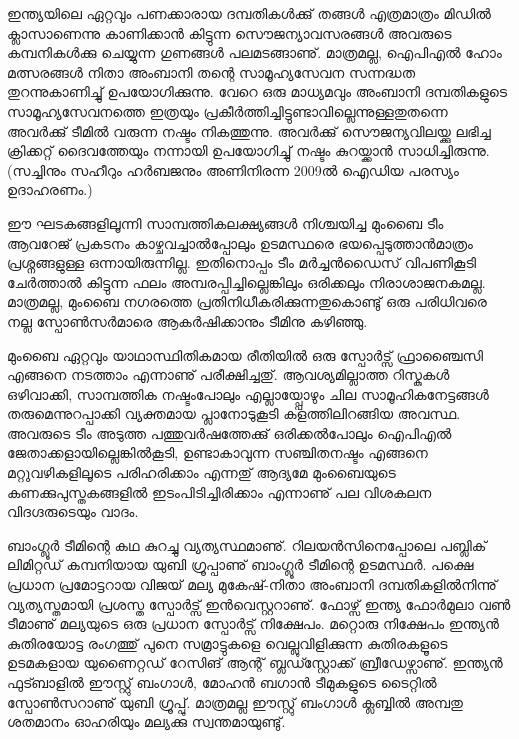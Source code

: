 ഇന്ത്യയിലെ ഏറ്റവും പണക്കാരായ ദമ്പതികള്‍ക്കു്  തങ്ങള്‍ എത്രമാത്രം മിഡില്‍ ക്ലാസാണെന്നു 
കാണിക്കാന്‍ കിട്ടുന്ന സൌജന്യാവസരങ്ങള്‍ അവരുടെ കമ്പനികള്‍ക്കു ചെയ്യുന്ന ഗുണങ്ങള്‍ പലമടങ്ങാണു്. മാത്രമല്ല, 
ഐപിഎല്‍ ഹോം മത്സരങ്ങള്‍ നിതാ അംബാനി തന്റെ സാമൂഹ്യസേവന സന്നദ്ധത തുറന്നുകാണിച്ചു് ഉപയോഗിക്കുന്നു. 
വേറെ ഒരു മാധ്യമവും അംബാനി ദമ്പതികളുടെ സാമൂഹ്യസേവനത്തെ ഇത്രയും പ്രകീര്‍ത്തിച്ചിട്ടുണ്ടാവില്ലെന്നുള്ളതുതന്നെ 
അവര്‍ക്കു് ടീമില്‍ വരുന്ന നഷ്ടം നികത്തുന്നു. അവര്‍ക്കു് സൌജന്യവിലയ്ക്കു ലഭിച്ച ക്രിക്കറ്റ് ദൈവത്തേയും നന്നായി ഉപയോഗിച്ചു് 
നഷ്ടം കുറയ്ക്കാന്‍ സാധിച്ചിരുന്നു. (സച്ചിനും സഹീറും ഹര്‍ബജനും അണിനിരന്ന 2009ല്‍ ഐഡിയ പരസ്യം ഉദാഹരണം.)

ഈ ഘടകങ്ങളിലൂന്നി സാമ്പത്തികലക്ഷ്യങ്ങള്‍ നിശ്ചയിച്ച മുംബൈ ടീം ആവറേജ് പ്രകടനം കാഴ്ചവച്ചാല്‍പ്പോലും ഉടമസ്ഥരെ 
ഭയപ്പെടുത്താന്‍മാത്രം പ്രശ്നങ്ങളുള്ള ഒന്നായിരുന്നില്ല. ഇതിനൊപ്പം ടീം മര്‍ച്ചന്‍ഡൈസ് വിപണികൂടി ചേര്‍ത്താല്‍ കിട്ടുന്ന 
ഫലം അമ്പരപ്പിച്ചില്ലെങ്കിലും ഒരിക്കലും നിരാശാജനകമല്ല. മാത്രമല്ല, മുംബൈ നഗരത്തെ പ്രതിനിധീകരിക്കുന്നതുകൊണ്ടു് ഒരു 
പരിധിവരെ നല്ല സ്പോണ്‍സര്‍മാരെ ആകര്‍ഷിക്കാനും ടീമിനു കഴിഞ്ഞു.

മുംബൈ ഏറ്റവും യാഥാസ്ഥിതികമായ രീതിയില്‍ ഒരു സ്പോര്‍ട്സ് ഫ്രാഞ്ചൈസി എങ്ങനെ നടത്താം എന്നാണു് പരീക്ഷിച്ചതു്. 
ആവശ്യമില്ലാത്ത റിസ്കുകള്‍ ഒഴിവാക്കി, സാമ്പത്തിക നഷ്ടംപോലും എല്ലായ്പ്പോഴും ചില സാമൂഹികനേട്ടങ്ങള്‍ തരുമെന്നുറപ്പാക്കി 
വ്യക്തമായ പ്ലാനോടുകൂടി കളത്തിലിറങ്ങിയ അവസ്ഥ. അവരുടെ ടീം അടുത്ത പത്തുവര്‍ഷത്തേക്കു് ഒരിക്കല്‍പോലും ഐപിഎല്‍ 
ജേതാക്കളായില്ലെങ്കില്‍കൂടി, ഉണ്ടാകാവുന്ന സഞ്ചിതനഷ്ടം എങ്ങനെ മറ്റുവഴികളിലൂടെ പരിഹരിക്കാം എന്നതു് ആദ്യമേ മുംബൈയുടെ 
കണക്കുപുസ്തകങ്ങളില്‍ ഇടംപിടിച്ചിരിക്കാം എന്നാണു് പല വിശകലന വിദഗ്ദരുടെയും വാദം.

ബാംഗ്ലൂര്‍ ടീമിന്റെ കഥ കുറച്ചു വ്യത്യസ്ഥമാണു്. റിലയന്‍സിനെപ്പോലെ പബ്ലിക് ലിമിറ്റഡ് കമ്പനിയായ യുബി ഗ്രൂപ്പാണു് 
ബാംഗ്ലൂര്‍ ടീമിന്റെ ഉടമസ്ഥര്‍. പക്ഷെ പ്രധാന പ്രമോട്ടറായ വിജയ് മല്യ മുകേഷ്-നിതാ അംബാനി ദമ്പതികളില്‍നിന്നു് 
വ്യത്യസ്തമായി പ്രശസ്ത സ്പോര്‍ട്സ് ഇന്‍വെസ്റ്ററാണു്. ഫോഴ്സ് ഇന്ത്യ ഫോര്‍മുലാ വണ്‍ ടീമാണു് മല്യയുടെ ഒരു പ്രധാന 
സ്പോര്‍ട്സ് നിക്ഷേപം. മറ്റൊരു നിക്ഷേപം ഇന്ത്യന്‍ കുതിരയോട്ട രംഗത്തു് പുനെ സമ്രാട്ടുകളെ വെല്ലുവിളിക്കുന്ന കുതിരകളൂടെ 
ഉടമകളായ യുണൈറ്റഡ് റേസിങ് ആന്റ് ബ്ലഡ്സ്റ്റോക്ക് ബ്രീഡേഴ്സാണു്. ഇന്ത്യന്‍ ഫുട്ബാളില്‍ ഈസ്റ്റു് ബംഗാള്‍, 
മോഹന്‍ ബഗാന്‍ ടീമുകളുടെ ടൈറ്റില്‍ സ്പോണ്‍സറാണു് യുബി ഗ്രൂപ്പു്. മാത്രമല്ല ഈസ്റ്റു് ബംഗാള്‍ ക്ലബ്ബില്‍ അമ്പതു 
ശതമാനം ഓഹരിയും മല്യക്കു സ്വന്തമായുണ്ടു്.


